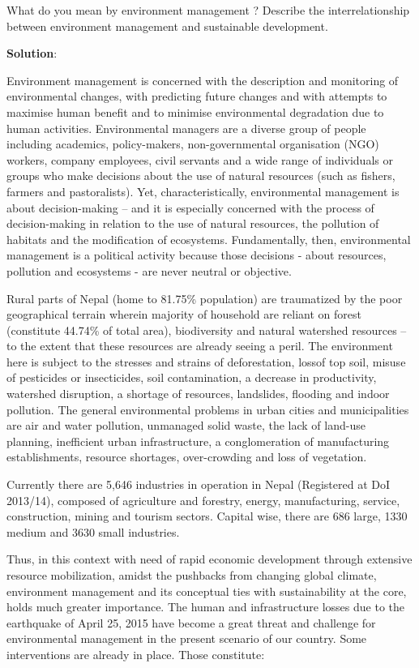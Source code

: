 \documentclass[
]{book}
\newcommand{\question}{\item}
\newenvironment{solution}{ {\bfseries Solution}:}{}
\begin{document}
\begin{questions}
\question What do you mean by environment management ? Describe the interrelationship between environment management and sustainable development.

\begin{solution}

Environment management is concerned with the description and monitoring of environmental changes, with predicting future changes and with attempts to maximise human benefit and to minimise environmental degradation due to human activities. Environmental managers are a diverse group of people including academics, policy-makers, non-governmental organisation (NGO) workers, company employees, civil servants and a wide range of individuals or groups who make decisions about the use of natural resources (such as fishers, farmers and pastoralists). Yet, characteristically, environmental management is about decision-making -- and it is especially concerned with the process of decision-making in relation to the use of natural resources, the pollution of habitats and the modification of ecosystems. Fundamentally, then, environmental management is a political activity because those decisions - about resources, pollution and ecosystems - are never neutral or objective.

Rural parts of Nepal (home to 81.75\% population) are traumatized by the poor geographical terrain wherein majority of household are reliant on forest (constitute 44.74\% of total area), biodiversity and natural watershed resources -- to the extent that these resources are already seeing a peril. The environment here is subject to the stresses and strains of deforestation, lossof top soil, misuse of pesticides or insecticides, soil contamination, a decrease in productivity, watershed disruption, a shortage of resources, landslides, flooding and indoor pollution. The general environmental problems in urban cities and municipalities are air and water pollution, unmanaged solid waste, the lack of land-use planning, inefficient urban infrastructure, a conglomeration of manufacturing establishments, resource shortages, over-crowding and loss of vegetation.

Currently there are 5,646 industries in operation in Nepal (Registered at DoI 2013/14), composed of agriculture and forestry, energy, manufacturing, service, construction, mining and tourism sectors. Capital wise, there are 686 large, 1330 medium and 3630 small industries.

Thus, in this context with need of rapid economic development through extensive resource mobilization, amidst the pushbacks from changing global climate, environment management and its conceptual ties with sustainability at the core, holds much greater importance. The human and infrastructure losses due to the earthquake of April 25, 2015 have become a great threat and challenge for environmental management in the present scenario of our country. Some interventions are already in place. Those constitute:


\end{solution}
\end{questions}
\end{document}
